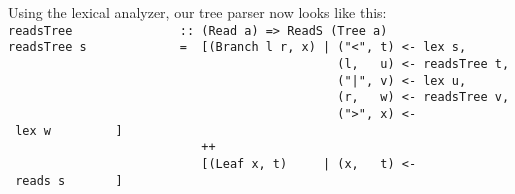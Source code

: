 Using the lexical analyzer, our tree parser now looks like this:
\bprog
\mbox{\tt readsTree\ \ \ \ \ \ \ \ \ \ \ \ \ \ \ ::\ (Read\ a)\ =>\ ReadS\ (Tree\ a)}\\
\mbox{\tt readsTree\ s\ \ \ \ \ \ \ \ \ \ \ \ \ =\ \ [(Branch\ l\ r,\ x)\ |\ ("<",\ t)\ <-\ lex\ s,}\\
\mbox{\tt \ \ \ \ \ \ \ \ \ \ \ \ \ \ \ \ \ \ \ \ \ \ \ \ \ \ \ \ \ \ \ \ \ \ \ \ \ \ \ \ \ \ \ \ \ \ (l,\ \ \ u)\ <-\ readsTree\ t,}\\
\mbox{\tt \ \ \ \ \ \ \ \ \ \ \ \ \ \ \ \ \ \ \ \ \ \ \ \ \ \ \ \ \ \ \ \ \ \ \ \ \ \ \ \ \ \ \ \ \ \ ("|",\ v)\ <-\ lex\ u,}\\
\mbox{\tt \ \ \ \ \ \ \ \ \ \ \ \ \ \ \ \ \ \ \ \ \ \ \ \ \ \ \ \ \ \ \ \ \ \ \ \ \ \ \ \ \ \ \ \ \ \ (r,\ \ \ w)\ <-\ readsTree\ v,}\\
\mbox{\tt \ \ \ \ \ \ \ \ \ \ \ \ \ \ \ \ \ \ \ \ \ \ \ \ \ \ \ \ \ \ \ \ \ \ \ \ \ \ \ \ \ \ \ \ \ \ (">",\ x)\ <-\ lex\ w\ \ \ \ \ \ \ \ \ ]}\\
\mbox{\tt \ \ \ \ \ \ \ \ \ \ \ \ \ \ \ \ \ \ \ \ \ \ \ \ \ \ \ ++}\\
\mbox{\tt \ \ \ \ \ \ \ \ \ \ \ \ \ \ \ \ \ \ \ \ \ \ \ \ \ \ \ [(Leaf\ x,\ t)\ \ \ \ \ |\ (x,\ \ \ t)\ <-\ reads\ s\ \ \ \ \ \ \ ]}
\eprog

